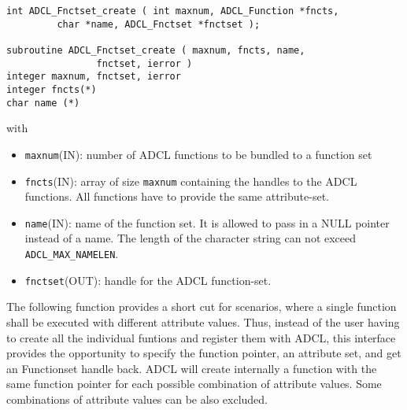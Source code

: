 \hspace{1cm}
\begin{verbatim}
int ADCL_Fnctset_create ( int maxnum, ADCL_Function *fncts, 
         char *name, ADCL_Fnctset *fnctset );

subroutine ADCL_Fnctset_create ( maxnum, fncts, name, 
                fnctset, ierror )
integer maxnum, fnctset, ierror
integer fncts(*)
char name (*)
\end{verbatim}
with
\begin{itemize}
\item {\tt maxnum}(IN): number of ADCL functions to be bundled to a function set
\item {\tt fncts}(IN): array of size {\tt maxnum} containing the handles to
  the ADCL functions. All functions have to provide the same attribute-set.
\item {\tt name}(IN): name of the function set. It is allowed to pass in a
  NULL pointer instead of a name. The length of the character string can not
  exceed {\tt ADCL\_MAX\_NAMELEN}.
\item {\tt fnctset}(OUT): handle for the ADCL function-set.
\end{itemize}


The following function provides a short cut for scenarios, where a single function
shall be executed with different attribute values. Thus, instead of the user
having to create all the individual funtions and register them with ADCL, this
interface provides the opportunity to specify the function pointer, an
attribute set, and get an Functionset handle back. ADCL will create internally
a function with the same function pointer for each possible combination of
attribute values. Some combinations of attribute values can be also excluded.

